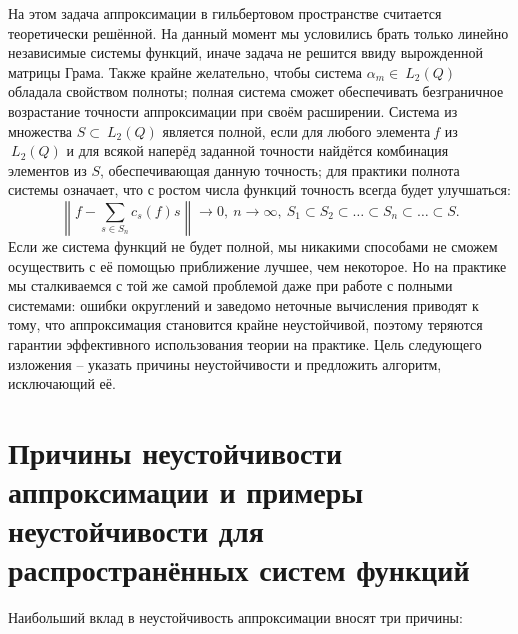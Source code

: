 ﻿\documentclass[a4paper, 12pt]{article}
\begin{document}
На этом задача аппроксимации в гильбертовом пространстве считается теоретически решённой. На данный момент мы условились брать только линейно независимые системы функций, иначе задача не решится ввиду вырожденной матрицы Грама. Также крайне желательно, чтобы система ${\alpha }_m\in {\ L}_2\left(Q\right)$ обладала свойством полноты; полная система сможет обеспечивать безграничное возрастание точности аппроксимации при своём расширении. Система из множества $S\subset {\ L}_2\left(Q\right)$ является полной, если для любого элемента$\ f$ из ${\ L}_2\left(Q\right)$ и для всякой наперёд заданной точности найдётся комбинация элементов из $S$, обеспечивающая данную точность; для практики полнота системы означает, что с ростом числа функций точность всегда будет улучшаться:
\begin{equation}\left\|f-\sum_{s\in S_n}{c_s\left(f\right)s}\right\|\to 0,\ n\to \infty ,\ S_1\subset S_2\subset \dots \subset S_n\subset \dots \subset S.\end{equation} 
Если же система функций не будет полной, мы никакими способами не сможем осуществить с её помощью приближение лучшее, чем некоторое. Но на практике мы сталкиваемся с той же самой проблемой даже при работе с полными системами: ошибки округлений и заведомо неточные вычисления приводят к тому, что аппроксимация становится крайне неустойчивой, поэтому теряются гарантии эффективного использования теории на практике. Цель следующего изложения -- указать причины неустойчивости и предложить алгоритм, исключающий её.


\section{Причины неустойчивости аппроксимации и примеры неустойчивости для распространённых систем функций}

Наибольший вклад в неустойчивость аппроксимации вносят три причины:
\end{document}
